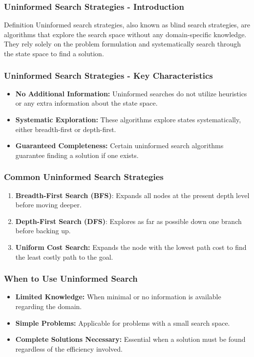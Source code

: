 \documentclass[aspectratio=169]{beamer}
\begin{document}
\begin{frame}[fragile]
    \frametitle{Uninformed Search Strategies - Introduction}
    \begin{block}{Definition}
        Uninformed search strategies, also known as blind search strategies, are algorithms that explore the search space without any domain-specific knowledge. They rely solely on the problem formulation and systematically search through the state space to find a solution.
    \end{block}
\end{frame}

\begin{frame}[fragile]
    \frametitle{Uninformed Search Strategies - Key Characteristics}
    \begin{itemize}
        \item \textbf{No Additional Information:} Uninformed searches do not utilize heuristics or any extra information about the state space.
        \item \textbf{Systematic Exploration:} These algorithms explore states systematically, either breadth-first or depth-first.
        \item \textbf{Guaranteed Completeness:} Certain uninformed search algorithms guarantee finding a solution if one exists.
    \end{itemize}
\end{frame}

\begin{frame}[fragile]
    \frametitle{Common Uninformed Search Strategies}
    \begin{enumerate}
        \item \textbf{Breadth-First Search (BFS)}: Expands all nodes at the present depth level before moving deeper.
        \item \textbf{Depth-First Search (DFS)}: Explores as far as possible down one branch before backing up.
        \item \textbf{Uniform Cost Search:} Expands the node with the lowest path cost to find the least costly path to the goal.
    \end{enumerate}
\end{frame}

\begin{frame}[fragile]
    \frametitle{When to Use Uninformed Search}
    \begin{itemize}
        \item \textbf{Limited Knowledge:} When minimal or no information is available regarding the domain.
        \item \textbf{Simple Problems:} Applicable for problems with a small search space.
        \item \textbf{Complete Solutions Necessary:} Essential when a solution must be found regardless of the efficiency involved.
    \end{itemize}
\end{frame}
\end{document}
